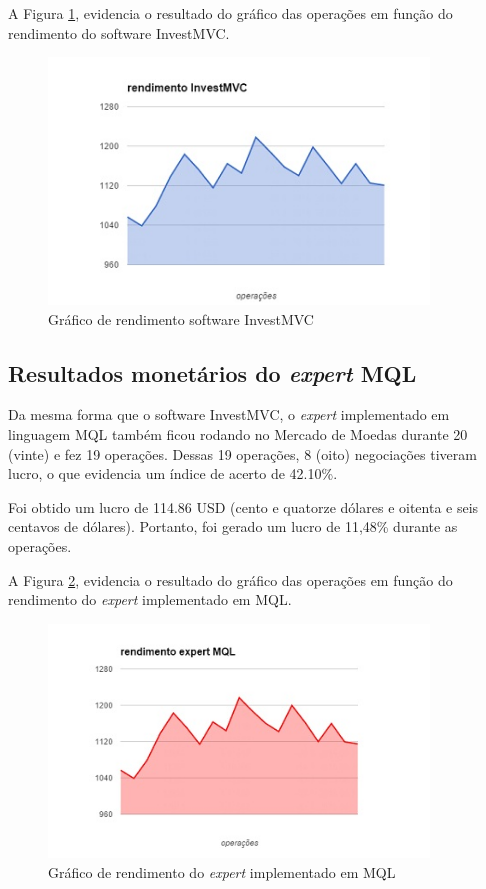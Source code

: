 A Figura \ref{rendimentoInvestMVC}, evidencia o resultado do gráfico das operações em função do rendimento do software InvestMVC.

\begin{figure}[H]
\centering
\includegraphics[width=0.9\textwidth]{figuras/rendimentoInvestMVC}
\caption{Gráfico de rendimento software InvestMVC}
\label{rendimentoInvestMVC}
\end{figure}

\subsection{Resultados monetários do \textit{expert} MQL}
Da mesma forma que o software InvestMVC, o \textit{expert} implementado em linguagem MQL também ficou rodando no Mercado de Moedas durante 20 (vinte) e fez 19 operações. Dessas 19 operações, 8 (oito) negociações tiveram lucro, o que evidencia um índice de acerto de 42.10\%.

Foi obtido um lucro de 114.86 USD (cento e quatorze dólares e oitenta e seis centavos de dólares). Portanto, foi gerado um lucro de 11,48\% durante as operações. 

A Figura \ref{rendimentoInvestMQL}, evidencia o resultado do gráfico das operações em função do rendimento do \textit{expert} implementado em MQL.

\begin{figure}[H]
\centering
\includegraphics[width=0.9\textwidth]{figuras/rendimentoMQL}
\caption{Gráfico de rendimento do \textit{expert} implementado em MQL}
\label{rendimentoInvestMQL}
\end{figure}

